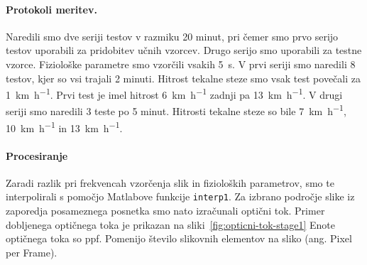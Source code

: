 \paragraph{Protokoli meritev.}
Naredili smo dve seriji testov v razmiku 20 minut, pri čemer smo prvo serijo testov uporabili za pridobitev učnih vzorcev. Drugo serijo smo uporabili za testne vzorce. Fiziološke parametre smo vzorčili vsakih \SI{5}{\s}. V prvi seriji smo naredili 8 testov, kjer so vsi trajali 2 minuti. Hitrost tekalne steze smo vsak test povečali za \SI{1}{\km\per\hour}. Prvi test je imel hitrost  \SI{6}{\km\per\hour} zadnji pa \SI{13}{\km\per\hour}. V drugi seriji smo naredili 3 teste po 5 minut. Hitrosti tekalne steze so bile  \SI{7}{\km\per\hour}, \SI{10}{\km\per\hour} in \SI{13}{\km\per\hour}.

\paragraph{Procesiranje}\label{sec:elementarni-postopek}
Zaradi razlik pri frekvencah vzorčenja slik in fizioloških parametrov, smo te interpolirali s pomočjo Matlabove funkcije \texttt{interp1}. Za izbrano področje slike iz zaporedja posameznega posnetka smo nato izračunali optični tok. Primer dobljenega optičnega toka je prikazan na sliki~\ref{fig:opticni-tok-stage1} Enote optičnega toka so \si{ppf}. Pomenijo število slikovnih elementov na sliko (ang. Pixel per Frame).


